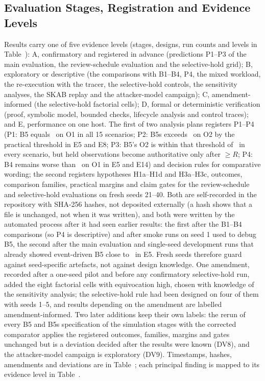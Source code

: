 \subsection{Evaluation Stages, Registration and Evidence Levels}\label{sec:design}

Results carry one of five evidence levels (stages, designs, run counts and levels in Table~): A, confirmatory and registered in advance (predictions P1--P3 of the main evaluation, the review-schedule evaluation and the selective-hold grid); B, exploratory or descriptive (the comparisons with B1--B4, P4, the mixed workload, the re-execution with the tracer, the selective-hold controls, the sensitivity analyses, the SKAB replay and the attacker-model campaign); C, amendment-informed (the selective-hold factorial cells); D, formal or deterministic verification (proof, symbolic model, bounded checks, lifecycle analysis and control traces); and E, performance on one host. The first of two analysis plans registers P1--P4 (P1: B5 equals \sys\ on O1 in all 15 scenarios; P2: B5s exceeds \sys\ on O2 by the practical threshold in E5 and E8; P3: B5's O2 is within that threshold of \sys\ in every scenario, but held observations become authoritative only after $\ge R$; P4: B4 remains worse than \sys\ on O1 in E5 and E14) and decision rules for comparative wording; the second registers hypotheses H1a--H1d and H3a--H3c, outcomes, comparison families, practical margins and claim gates for the review-schedule and selective-hold evaluations on fresh seeds 21--40. Both are self-recorded in the repository with SHA-256 hashes, not deposited externally (a hash shows that a file is unchanged, not when it was written), and both were written by the automated process after it had seen earlier results: the first after the B1--B4 comparisons (so P4 is descriptive) and after smoke runs on seed 1 used to debug B5, the second after the main evaluation and single-seed development runs that already showed event-driven B5 close to \sys\ in E5. Fresh seeds therefore guard against seed-specific artefacts, not against design knowledge. One amendment, recorded after a one-seed pilot and before any confirmatory selective-hold run, added the eight factorial cells with equivocation high, chosen with knowledge of the sensitivity analysis; the selective-hold rule had been designed on four of them with seeds 1--5, and results depending on the amendment are labelled amendment-informed. Two later additions keep their own labels: the rerun of every B5 and B5s specification of the simulation stages with the corrected comparator applies the registered outcomes, families, margins and gates unchanged but is a deviation decided after the results were known (DV8), and the attacker-model campaign is exploratory (DV9). Timestamps, hashes, amendments and deviations are in Table~; each principal finding is mapped to its evidence level in Table~.


